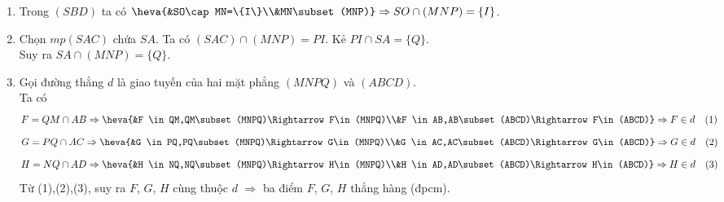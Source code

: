 \begin{bt}
{\begin{center}
		\end{center}
		\begin{enumerate}
			\item Trong $(SBD)$ ta có $\heva{&SO\cap MN=\{I\}\\&MN\subset(MNP)}\Rightarrow SO\cap(MNP)=\{I\}$.
			\item Chọn $mp(SAC)$ chứa $SA$.
			Ta có $(SAC)\cap(MNP)=PI$. Kẻ $PI\cap SA=\{Q\}$.\\
			Suy ra $SA\cap(MNP)=\{Q\}$.
			\item Gọi đường thẳng $d$ là giao tuyến của hai mặt phẳng $(MNPQ)$ và $(ABCD)$.\\
			Ta có 
			$$F=QM\cap AB \Rightarrow \heva{&F \in QM,QM\subset (MNPQ)\Rightarrow F\in(MNPQ)\\&F \in AB,AB\subset (ABCD)\Rightarrow F\in(ABCD)}\Rightarrow F\in d\quad (1)$$
			$$G=PQ\cap AC \Rightarrow \heva{&G \in PQ,PQ\subset (MNPQ)\Rightarrow G\in(MNPQ)\\&G \in AC,AC\subset (ABCD)\Rightarrow G\in(ABCD)}\Rightarrow G\in d\quad (2)$$
			$$H=NQ\cap AD \Rightarrow \heva{&H \in NQ,NQ\subset (MNPQ)\Rightarrow H\in(MNPQ)\\&H \in AD,AD\subset (ABCD)\Rightarrow H\in(ABCD)}\Rightarrow H\in d\quad (3)$$
			Từ (1),(2),(3), suy ra $F$, $G$, $H$ cùng thuộc $d$ $\Rightarrow$ ba điểm $F$, $G$, $H$ thẳng hàng (đpcm).
		\end{enumerate}	
	}
\end{bt}

